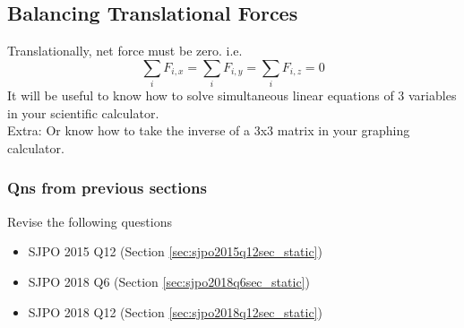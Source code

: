 \documentclass{article}
\begin{document}
\subsection{Balancing Translational Forces}
Translationally, net force must be zero. i.e. $$\sum_i F_{i,x} = \sum_i F_{i,y} = \sum_i F_{i,z} = 0$$
It will be useful to know how to solve simultaneous linear equations of 3 variables in your scientific calculator. \\[10pt]
Extra: Or know how to take the inverse of a 3x3 matrix in your graphing calculator.
\subsubsection{Qns from previous sections}
Revise the following questions
\begin{itemize}
    \item SJPO 2015 Q12 (Section \ref{sec:sjpo2015q12sec_static})
    \item SJPO 2018 Q6 (Section \ref{sec:sjpo2018q6sec_static})
    \item SJPO 2018 Q12 (Section \ref{sec:sjpo2018q12sec_static})
\end{itemize}
\clearpage
\end{document}
